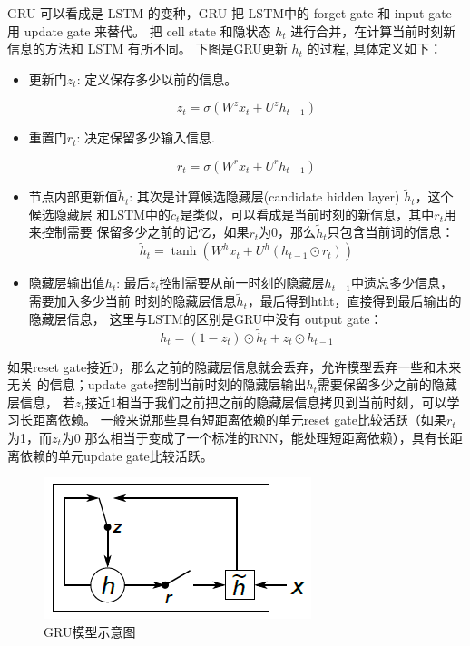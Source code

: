 \documentclass[twoside]{buaathesis}
\begin{document}
GRU 可以看成是 LSTM 的变种，GRU 把 LSTM中的 forget gate 和 input gate 用 update gate 来替代。 把 cell state 和隐状态 $h_t$ 进行合并，在计算当前时刻新信息的方法和 LSTM 有所不同。 下图是GRU更新 $h_t$ 的过程\cite{DBLP:journals/corr/Pezeshki15}, 具体定义如下：
\begin{itemize}
\item 更新门$z_t$: 定义保存多少以前的信息。

\[z_t = \sigma ( W^z x_t+ U^z h_{t-1}  )\]

\item 重置门$r_t$: 决定保留多少输入信息.

\[r_t = \sigma(W^r x_t  + U^r h_{t-1}  )\]

\item 节点内部更新值$\tilde h_t $: 其次是计算候选隐藏层(candidate hidden layer) $\tilde h_t$，这个候选隐藏层 和LSTM中的$\tilde c_t$是类似，可以看成是当前时刻的新信息，其中$r_t$用来控制需要 保留多少之前的记忆，如果$r_t$为0，那么$\tilde h_t$只包含当前词的信息：
 \[\tilde h_t  = \tanh (W^h x_t  + U^h(h_{t-1} \odot r_t) )\]

\item 隐藏层输出值$h_t$: 最后$z_t$控制需要从前一时刻的隐藏层$h_{t−1}$中遗忘多少信息，需要加入多少当前 时刻的隐藏层信息$\tilde h_t$，最后得到htht，直接得到最后输出的隐藏层信息， 这里与LSTM的区别是GRU中没有 output gate：
\[h_t = (1-z_t)\odot \tilde h_t  + z_t \odot h_{t-1}\]
\end{itemize}
如果reset gate接近0，那么之前的隐藏层信息就会丢弃，允许模型丢弃一些和未来无关 的信息；update gate控制当前时刻的隐藏层输出$h_t$需要保留多少之前的隐藏层信息， 若$z_t$接近1相当于我们之前把之前的隐藏层信息拷贝到当前时刻，可以学习长距离依赖。 一般来说那些具有短距离依赖的单元reset gate比较活跃（如果$r_t$为1，而$z_t$为$0$ 那么相当于变成了一个标准的RNN，能处理短距离依赖），具有长距离依赖的单元update gate比较活跃。

\begin{figure}
  \centering
  \includegraphics[width=0.6\linewidth]{./figures/gru.png}
  \caption{GRU模型示意图}\label{fig:gru}
\end{figure}
\end{document}
